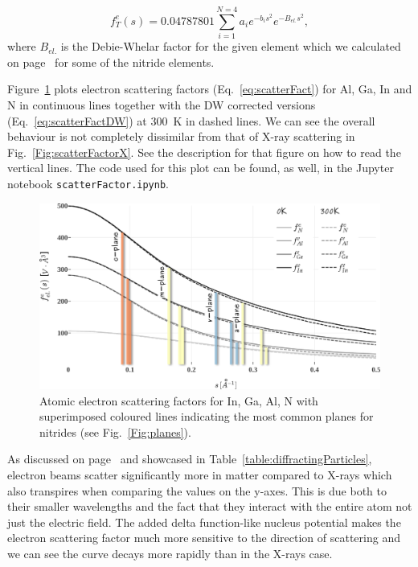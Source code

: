 \begin{equation}
\label{eq:scatterFactDW}
f_T^e(s) = 0.04787801\sum_{i=1}^{N=4} a_i e^{-b_i s^2}  e^{-B_{el.} s^2},
\end{equation}
where $B_{el.}$ is the Debie-Whelar factor for the given element which we calculated on page~\pageref{Sec:DWf} for some of the nitride elements.

Figure~\ref{Fig:scatterFactor_e} plots electron scattering factors (Eq.~\ref{eq:scatterFact}) for Al, Ga, In and N in continuous lines together with the DW corrected versions (Eq.~\ref{eq:scatterFactDW}) at \SI{300}{K} in dashed lines. We can see the overall behaviour is not completely dissimilar from that of X-ray scattering in Fig.~\ref{Fig:scatterFactorX}. See the description for that figure on how to read the vertical lines. The code used for this plot can be found, as well, in the Jupyter notebook {\tt scatterFactor.ipynb}. 


\begin{figure}
    \centering
\includegraphics[width=1\linewidth]{Figures/scatterFactor_ecor.png}
\caption[Atomic electron scattering factors.]{Atomic electron scattering factors for In, Ga, Al, N with superimposed coloured lines indicating the most common planes for nitrides (see Fig.~\ref{Fig:planes}). }
\label{Fig:scatterFactor_e}
\end{figure}


As discussed on page~\pageref{table:diffractingParticles} and showcased in Table~\ref{table:diffractingParticles}, electron beams scatter significantly more in matter compared to X-rays which also transpires when comparing the values on the y-axes. This is due both to their smaller wavelengths and the fact that they interact with the entire atom not just the electric field. The added delta function-like nucleus potential makes the electron scattering factor much more sensitive to the direction of scattering and we can see the curve decays more rapidly than in the X-rays case. 


